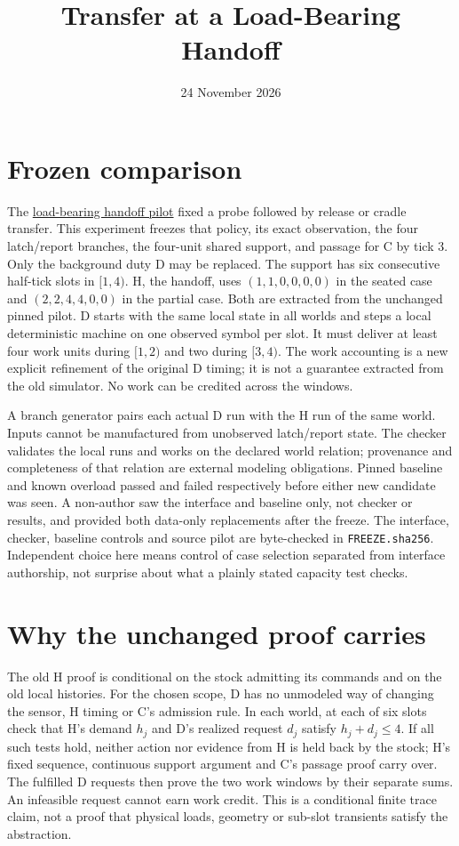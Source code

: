 \documentclass[11pt]{article}
\title{Transfer at a Load-Bearing Handoff}
\date{24 November 2026}
\begin{document}
\maketitle

\section{Frozen comparison}
The \href{https://chatgpt.com/space/page_f627a3ba3b248191883a231eba809a18}{load-bearing handoff pilot} fixed a probe followed by release or cradle transfer. This experiment freezes that policy, its exact observation, the four latch/report branches, the four-unit shared support, and passage for C by tick 3. Only the background duty D may be replaced. The support has six consecutive half-tick slots in \([1,4)\). H, the handoff, uses \((1,1,0,0,0,0)\) in the seated case and \((2,2,4,4,0,0)\) in the partial case. Both are extracted from the unchanged pinned pilot. D starts with the same local state in all worlds and steps a local deterministic machine on one observed symbol per slot. It must deliver at least four work units during \([1,2)\) and two during \([3,4)\). The work accounting is a new explicit refinement of the original D timing; it is not a guarantee extracted from the old simulator. No work can be credited across the windows.

A branch generator pairs each actual D run with the H run of the same world. Inputs cannot be manufactured from unobserved latch/report state. The checker validates the local runs and works on the declared world relation; provenance and completeness of that relation are external modeling obligations. Pinned baseline and known overload passed and failed respectively before either new candidate was seen. A non-author saw the interface and baseline only, not checker or results, and provided both data-only replacements after the freeze. The interface, checker, baseline controls and source pilot are byte-checked in \texttt{FREEZE.sha256}. Independent choice here means control of case selection separated from interface authorship, not surprise about what a plainly stated capacity test checks.

\section{Why the unchanged proof carries}
The old H proof is conditional on the stock admitting its commands and on the old local histories. For the chosen scope, D has no unmodeled way of changing the sensor, H timing or C's admission rule. In each world, at each of six slots check that H's demand \(h_j\) and D's realized request \(d_j\) satisfy \(h_j+d_j\le4\). If all such tests hold, neither action nor evidence from H is held back by the stock; H's fixed sequence, continuous support argument and C's passage proof carry over. The fulfilled D requests then prove the two work windows by their separate sums. An infeasible request cannot earn work credit. This is a conditional finite trace claim, not a proof that physical loads, geometry or sub-slot transients satisfy the abstraction.
\end{document}
